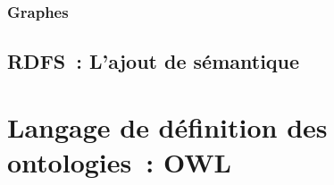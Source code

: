 \subsubsection{Graphes}
\label{sec:sec:semantic-web-rdf-rdf-graphs}


\subsection{RDFS~: L'ajout de sémantique}
\label{sec:semantic-web-rdfs}

\section{Langage de définition des ontologies~: OWL}
\label{sec:semantic-web-owl}







